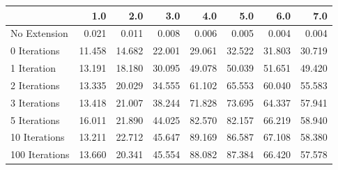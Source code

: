 \begin{tabular}{lrrrrrrr}
\toprule
{} &    1.0 &    2.0 &    3.0 &    4.0 &    5.0 &    6.0 &    7.0 \\
\midrule
No Extension   &  0.021 &  0.011 &  0.008 &  0.006 &  0.005 &  0.004 &  0.004 \\
0 Iterations   & 11.458 & 14.682 & 22.001 & 29.061 & 32.522 & 31.803 & 30.719 \\
1 Iteration    & 13.191 & 18.180 & 30.095 & 49.078 & 50.039 & 51.651 & 49.420 \\
2 Iterations   & 13.335 & 20.029 & 34.555 & 61.102 & 65.553 & 60.040 & 55.583 \\
3 Iterations   & 13.418 & 21.007 & 38.244 & 71.828 & 73.695 & 64.337 & 57.941 \\
5 Iterations   & 16.011 & 21.890 & 44.025 & 82.570 & 82.157 & 66.219 & 58.940 \\
10 Iterations  & 13.211 & 22.712 & 45.647 & 89.169 & 86.587 & 67.108 & 58.380 \\
100 Iterations & 13.660 & 20.341 & 45.554 & 88.082 & 87.384 & 66.420 & 57.578 \\
\bottomrule
\end{tabular}
